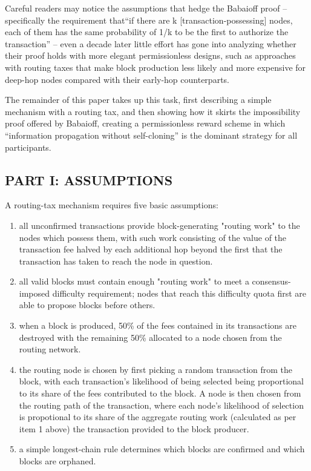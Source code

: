\documentclass[oneside]{article}   	%
\begin{document}
\begin{multicols}{2}
Careful readers may notice the assumptions that hedge the Babaioff proof -- specifically the requirement that``if there are k [transaction-possessing] nodes, each of them has the same probability of 1/k to be the first to authorize the transaction'' -- even a decade later little effort has gone into analyzing whether their proof holds with more elegant permissionless designs, such as approaches with routing taxes that make block production less likely and more expensive for deep-hop nodes compared with their early-hop counterparts.

The remainder of this paper takes up this task, first describing a simple mechanism with a routing tax, and then showing how it skirts the impossibility proof offered by Babaioff, creating a permissionless reward scheme in which ``information propagation without self-cloning'' is the dominant strategy for all participants.

\subsection*{PART I: ASSUMPTIONS}

A routing-tax mechanism requires five basic assumptions:

\begin{enumerate}
  \item all unconfirmed transactions provide block-generating "routing work" to the nodes which possess them, with such work consisting of the value of the transaction fee halved by each additional hop beyond the first that the transaction has taken to reach the node in question.
  \item all valid blocks must contain enough "routing work" to meet a consensus-imposed difficulty requirement; nodes that reach this difficulty quota first are able to propose blocks before others.
  \item when a block is produced, 50\% of the fees contained in its transactions are destroyed with the remaining 50\% allocated to a node chosen from the routing network.
  \item the routing node is chosen by first picking a random transaction from the block, with each transaction's likelihood of being selected being proportional to its share of the fees contributed to the block. A node is then chosen from the routing path of the transaction, where each node's likelihood of selection is propotional to its share of the aggregate routing work (calculated as per item 1 above) the transaction provided to the block producer.
  \item a simple longest-chain rule determines which blocks are confirmed and which blocks are orphaned.


\end{enumerate}
\end{multicols}
\end{document}
